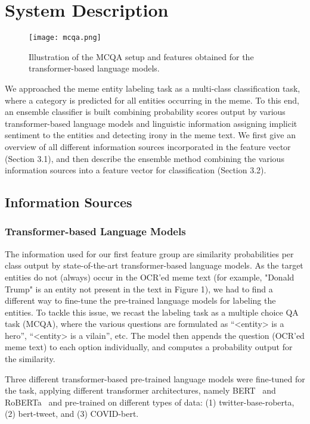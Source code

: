 \documentclass[11pt]{article}
\begin{document}
\section{System Description}

\begin{figure*}[t!]
    \centering
    \texttt{[image: mcqa.png]}
    \caption{Illustration of the MCQA setup and features obtained for the transformer-based language models.}
    \label{fig1}
\end{figure*}


We approached the meme entity labeling task as a multi-class classification task, where a category is predicted for all entities occurring in the meme. To this end, an ensemble classifier is built combining probability scores output by various transformer-based language models and linguistic information assigning implicit sentiment to the entities and detecting irony in the meme text. We first give an overview of all different information sources incorporated in the feature vector (Section 3.1), and then describe the ensemble method combining the various information sources into a feature vector for classification (Section 3.2).

\subsection{Information Sources}

\subsubsection{Transformer-based Language Models}

The information used for our first feature group are similarity probabilities per class output by state-of-the-art transformer-based language models. As the target entities do not (always) occur in the OCR'ed meme text (for example, "Donald Trump" is an entity not present in the text in Figure 1), we had to find a different way to fine-tune the pre-trained language models for labeling the entities. To tackle this issue, we recast the labeling task as a multiple choice QA task (MCQA), where the various questions are formulated as ``<entity> is a hero'', ``<entity> is a vilain'', etc. The model then appends the question (OCR'ed meme text) to each option individually, and computes a probability output for the similarity.

Three different transformer-based pre-trained language models were fine-tuned for the task, applying different transformer architectures, namely BERT~\cite{Devlin2019} and RoBERTa~\cite{Liu2019} and pre-trained on different types of data: (1) twitter-base-roberta, (2) bert-tweet, and (3) COVID-bert.
\end{document}
